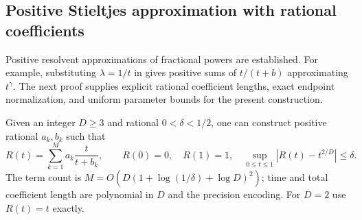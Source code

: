 \subsection{Positive Stieltjes approximation with rational coefficients}

Positive resolvent approximations of fractional powers are established.
For example, substituting $\lambda=1/t$ in
\citet[Section 3.3, equation (37) and Lemma 3.4]{bonito2015} gives
positive sums of $t/(t+b)$ approximating $t^\gamma$. The next proof
supplies explicit rational coefficient lengths, exact endpoint
normalization, and uniform parameter bounds for the present construction.

\begin{lemma}\label{lem:stieltjes-power}
Given an integer $D\ge3$ and rational $0<\delta<1/2$, one can
construct positive rational $a_k,b_k$ such that
\[
 R(t)=\sum_{k=1}^M a_k\frac{t}{t+b_k},\qquad
 R(0)=0,\quad R(1)=1,\quad
 \sup_{0\le t\le1}|R(t)-t^{2/D}|\le\delta.
\]
The term count is
$M=O(D(1+\log(1/\delta)+\log D)^2)$; time and total coefficient
length are polynomial in $D$ and the precision encoding. For $D=2$
use $R(t)=t$ exactly.
\end{lemma}
